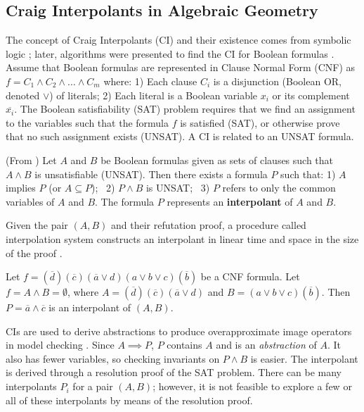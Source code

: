 \subsection{Craig Interpolants in Algebraic Geometry}
The concept of Craig Interpolants (CI) and their existence comes from
symbolic logic \cite{craig-interpolate}; later, algorithms were
presented to find the CI for Boolean formulas
\cite{pudlak:ci, mcmillan2003interpolation}. Assume that Boolean
formulas are represented in Clause Normal Form (CNF) as 
$f = C_1 \wedge C_2 \wedge \dots \wedge C_m$ where: 1) Each clause
$C_i$ is a disjunction (Boolean OR, denoted $\vee$) of literals; 2)
Each literal is a Boolean variable $x_i$ or its complement
$\overline{x_i}$. 
The Boolean satisfiability (SAT) problem requires that we find an
assignment to the variables such that the formula $f$ is satisfied
(SAT), or otherwise prove that no such assignment exists (UNSAT). 
A CI is related to an UNSAT formula. 

\begin{Definition}
(From \cite{mcmillan2003interpolation}) Let $A$ and $B$ be Boolean
  formulas given as sets of clauses such that $A \wedge B$ is
  unsatisfiable (UNSAT). Then there exists a formula $P$ such that: 
1) $A$ implies $P$ (or $A \subseteq P$); ~2) $P \wedge B$ is UNSAT; ~3)
$P$ refers to only the common variables of $A$ and $B$. The formula
$P$ represents an {\bf interpolant} of $A$ and $B$. 

Given  the pair $(A, B)$ and their refutation proof, a procedure
called interpolation system constructs an interpolant in linear time
and space in the size of the proof \cite{mcmillan2003interpolation}
\cite{pudlak:ci}. 
\end{Definition}

\begin{Example}\label{ex1}
Let $f = (\overline{d})(\overline{c})(\overline{a}\vee d)(a
\vee b \vee c)(\overline{b})$ be a CNF formula. Let $f = A \wedge B =
\emptyset$, where $A = (\overline{d})(\overline{c})(\overline{a}\vee
d)$ and  $B = (a \vee b \vee c)(\overline{b})$. Then $P = \overline{a}
\wedge \overline{c}$ is an interpolant of $(A, B)$. 
\end{Example}

CIs are used to derive abstractions to produce overapproximate image
operators in model checking \cite{mcmillan2003interpolation}. Since $A
\implies P$, $P$ contains $A$ and is an {\it abstraction} of $A$. It
also has fewer variables, so checking  invariants on $P \wedge B$ is
easier. The interpolant is derived through a resolution proof of the
SAT problem. There can be many interpolants $P_i$ for a pair $(A,B)$; 
however, it is not feasible to explore a few or all of these
interpolants by means of the resolution proof. 



